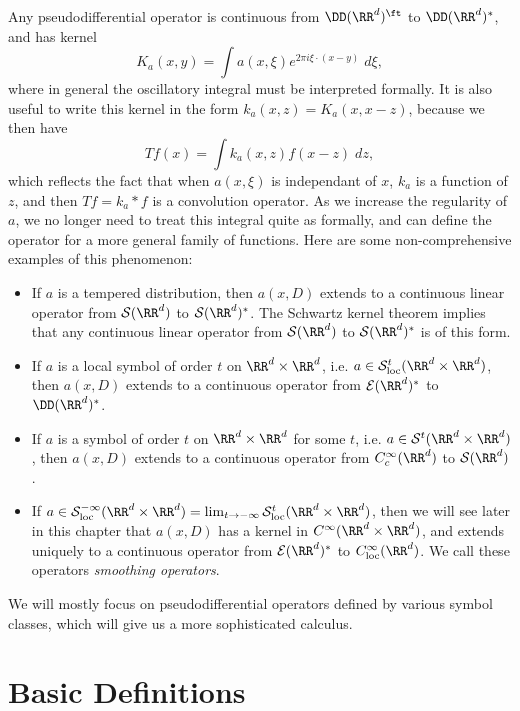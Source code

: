 Any pseudodifferential operator is continuous from $\DD(\RR^d)^\ft$ to $\DD(\RR^d)^*$, and has kernel
%
\[ K_a(x,y) = \int a(x,\xi) e^{2 \pi i \xi \cdot (x - y)}\; d\xi, \]
%
where in general the oscillatory integral must be interpreted formally. It is also useful to write this kernel in the form $k_a(x,z) = K_a(x,x-z)$, because we then have
%
\[ Tf(x) = \int k_a(x,z) f(x-z)\; dz, \]
%
which reflects the fact that when $a(x,\xi)$ is independant of $x$, $k_a$ is a function of $z$, and then $Tf = k_a * f$ is a convolution operator. As we increase the regularity of $a$, we no longer need to treat this integral quite as formally, and can define the operator for a more general family of functions. Here are some non-comprehensive examples of this phenomenon:
%
\begin{itemize}
    \item If $a$ is a tempered distribution, then $a(x,D)$ extends to a continuous linear operator from $\mathcal{S}(\RR^d)$ to $\mathcal{S}(\RR^d)^*$. The Schwartz kernel theorem implies that any continuous linear operator from $\mathcal{S}(\RR^d)$ to $\mathcal{S}(\RR^d)^*$ is of this form.

    \item If $a$ is a local symbol of order $t$ on $\RR^d \times \RR^d$, i.e. $a \in \mathcal{S}^t_{\text{loc}}(\RR^d \times \RR^d)$, then $a(x,D)$ extends to a continuous operator from $\mathcal{E}(\RR^d)^*$ to $\DD(\RR^d)^*$.

    \item If $a$ is a symbol of order $t$ on $\RR^d \times \RR^d$ for some $t$, i.e. $a \in \mathcal{S}^t(\RR^d \times \RR^d)$, then $a(x,D)$ extends to a continuous operator from $C_c^\infty(\RR^d)$ to $\mathcal{S}(\RR^d)$.

    \item If $a \in \mathcal{S}^{-\infty}_{\text{loc}}(\RR^d \times \RR^d) = \lim_{t \to -\infty} \mathcal{S}^t_{\text{loc}}(\RR^d \times \RR^d)$, then we will see later in this chapter that $a(x,D)$ has a kernel in $C^\infty(\RR^d \times \RR^d)$, and extends uniquely to a continuous operator from $\mathcal{E}(\RR^d)^*$ to $C^\infty_{\text{loc}}(\RR^d)$. We call these operators \emph{smoothing operators}.
\end{itemize}
%
We will mostly focus on pseudodifferential operators defined by various symbol classes, which will give us a more sophisticated calculus.

\section{Basic Definitions}

